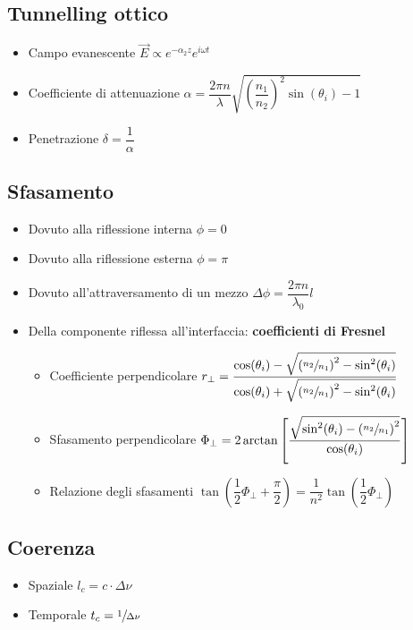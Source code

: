 \documentclass[9pt]{extarticle}
\begin{document}
\subsection{Tunnelling ottico}
\begin{itemize}
  \item Campo evanescente \( \vec{E} \propto e^{-\alpha_2 z} e ^ { i \omega t } \)
  \item Coefficiente di attenuazione \( \alpha = \dfrac{2 \pi n}{\lambda} \sqrt{ \left( \dfrac{n_1}{n_2} \right) ^ 2 \sin(\theta_i) - 1} \)
  \item Penetrazione \( \delta = \dfrac{1}{\alpha} \)
\end{itemize}

\newpage

\subsection{Sfasamento}
\begin{itemize}
  \item Dovuto alla riflessione interna \( \phi = 0 \)
  \item Dovuto alla riflessione esterna \( \phi = \pi \)
  \item Dovuto all'attraversamento di un mezzo \( \Delta \phi = \dfrac{2 \pi n}{\lambda_0} l \)
  \item Della componente riflessa all'interfaccia: \textbf{coefficienti di Fresnel}
        \begin{itemize}
          \item Coefficiente perpendicolare \( r_\perp = \dfrac{\cos(\theta_i) - \sqrt{\left( \sfrac{n_2}{n_1} \right) ^ 2 - \sin^2(\theta_i)}}{\cos(\theta_i) + \sqrt{\left( \sfrac{n_2}{n_1} \right) ^ 2 - \sin^2(\theta_i)}} \)
          \item Sfasamento perpendicolare \( \Phi_\perp = 2 \arctan \left[ \dfrac{ \sqrt{\sin^2(\theta_i) - \left( \sfrac{n_2}{n_1} \right) ^ 2 } }{ \cos(\theta_i) } \right] \)
          \item Relazione degli sfasamenti \( \tan \left( \dfrac{1}{2} \Phi_\perp + \dfrac{\pi}{2} \right) = \dfrac{1}{n ^ 2} \tan \left( \dfrac{1}{2} \Phi_\perp \right) \)
        \end{itemize}
\end{itemize}

\subsection{Coerenza}
\begin{itemize}
  \item Spaziale \( l_c = c \cdot \Delta \nu \)
  \item Temporale \( t_c = \sfrac{1}{\Delta \nu} \)
\end{itemize}
\end{document}
